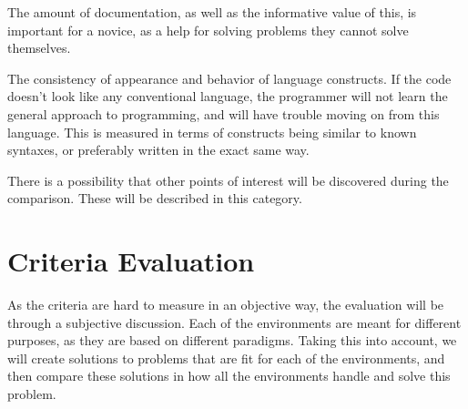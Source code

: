 \begin{description}[style=nextline]
\item[Documentation] The amount of documentation, as well as the informative value of this, is important for a novice, as a help for solving problems they cannot solve themselves.
\item[Uniformity] The consistency of appearance and behavior of language constructs. If the code doesn't look like any conventional language, the programmer will not learn the general approach to programming, and will have trouble moving on from this language. This is measured in terms of constructs being similar to known syntaxes, or preferably written in the exact same way.
\item[Miscellaneous] There is a possibility that other points of interest will be discovered during the comparison. These will be described in this category.
\end{description}


\section{Criteria Evaluation}
As the criteria are hard to measure in an objective way, the evaluation will be through a subjective discussion. Each of the environments are meant for different purposes, as they are based on different paradigms. Taking this into account, we will create solutions to problems that are fit for each of the environments, and then compare these solutions in how all the environments handle and solve this problem.